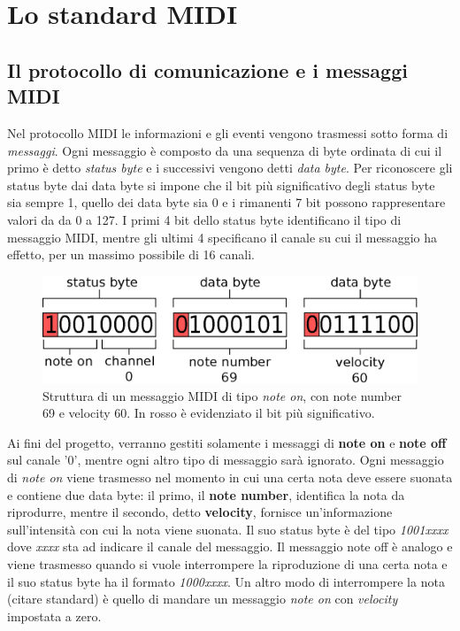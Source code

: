 \chapter{Lo standard MIDI}
\label{chap:midi}

\section{Il protocollo di comunicazione e i messaggi MIDI}
Nel protocollo MIDI\cite{midispec} le informazioni e gli eventi vengono trasmessi sotto forma di \textit{messaggi}.
Ogni messaggio è composto da una sequenza di byte ordinata di cui il primo è detto \textit{status byte} e i successivi
vengono detti \textit{data byte}.
Per riconoscere gli status byte dai data byte si impone che il bit più significativo degli status byte sia sempre 1, quello dei data byte sia 0 e
i rimanenti 7 bit possono rappresentare valori da da 0 a 127.
I primi 4 bit dello status byte identificano il tipo di messaggio MIDI, mentre gli ultimi 4 specificano il canale su cui il messaggio ha effetto,
per un massimo possibile di 16 canali.

\begin{figure}
    \centering
    \def\svgwidth{\columnwidth}
    \includegraphics[width=0.7\columnwidth]{TeX_files/midi_message.eps}
    \caption{Struttura di un messaggio MIDI di tipo \textit{note on},
    	     con note number 69 e velocity 60. In rosso è evidenziato
             il bit più significativo.}
\end{figure}

Ai fini del progetto, verranno gestiti solamente i messaggi di \textbf{note on} e \textbf{note off} sul canale '0', mentre
ogni altro tipo di messaggio sarà ignorato.
Ogni messaggio di \textit{note on} viene trasmesso nel momento in cui una certa nota deve essere suonata e contiene due data byte: 
il primo, il \textbf{note number}, identifica la nota da riprodurre, mentre il secondo, detto \textbf{velocity}, fornisce un'informazione
sull'intensità con cui la nota viene suonata. Il suo status byte è del tipo
\textit{1001xxxx} dove \textit{xxxx} sta ad indicare il canale del
messaggio.
Il messaggio note off è analogo e viene trasmesso quando si vuole
interrompere la riproduzione di una certa nota e il suo status byte
ha il formato \textit{1000xxxx}.
Un altro modo di interrompere la nota (citare standard) è quello di mandare
un messaggio \textit{note on} con \textit{velocity} impostata a zero.

